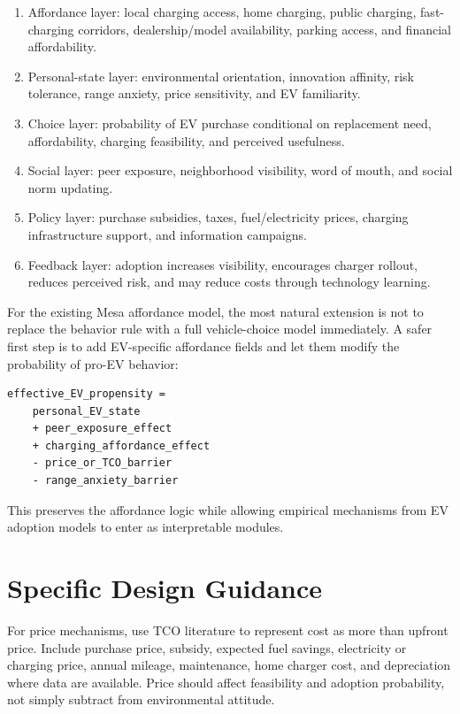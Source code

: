 \documentclass[11pt]{article}
\begin{document}
\begin{enumerate}
    \item Affordance layer: local charging access, home charging, public
    charging, fast-charging corridors, dealership/model availability, parking
    access, and financial affordability.
    \item Personal-state layer: environmental orientation, innovation affinity,
    risk tolerance, range anxiety, price sensitivity, and EV familiarity.
    \item Choice layer: probability of EV purchase conditional on replacement
    need, affordability, charging feasibility, and perceived usefulness.
    \item Social layer: peer exposure, neighborhood visibility, word of mouth,
    and social norm updating.
    \item Policy layer: purchase subsidies, taxes, fuel/electricity prices,
    charging infrastructure support, and information campaigns.
    \item Feedback layer: adoption increases visibility, encourages charger
    rollout, reduces perceived risk, and may reduce costs through technology
    learning.
\end{enumerate}

For the existing Mesa affordance model, the most natural extension is not to
replace the behavior rule with a full vehicle-choice model immediately. A safer
first step is to add EV-specific affordance fields and let them modify the
probability of pro-EV behavior:

\begin{verbatim}
effective_EV_propensity =
    personal_EV_state
    + peer_exposure_effect
    + charging_affordance_effect
    - price_or_TCO_barrier
    - range_anxiety_barrier
\end{verbatim}

This preserves the affordance logic while allowing empirical mechanisms from EV
adoption models to enter as interpretable modules.

\section{Specific Design Guidance}

For price mechanisms, use TCO literature to represent cost as more than upfront
price. Include purchase price, subsidy, expected fuel savings, electricity or
charging price, annual mileage, maintenance, home charger cost, and depreciation
where data are available. Price should affect feasibility and adoption
probability, not simply subtract from environmental attitude.
\end{document}
